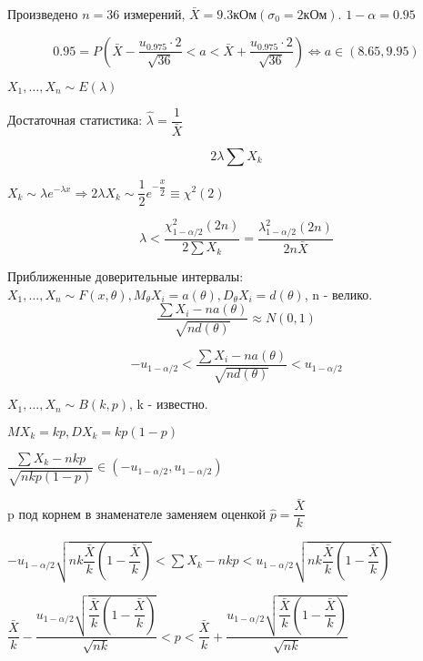 \begin{ex}
  Произведено $n=36$ измерений, $\bar X = 9.3 \text{кОм} (\sigma_0 = 2 \text{кОм})$.
$1- \alpha = 0.95$

\[
  0.95 = P\left(\bar X - \dfrac{u_{0.975} \cdot 2}{\sqrt{36}} < a < \bar X + \dfrac{u_{0.975} \cdot 2}{\sqrt{36}}\right) \Leftrightarrow a \in (8.65, 9.95)
\]
\end{ex}

\begin{ex}
  $X_1, \dots, X_n \sim E(\lambda)$

  Достаточная статистика: $\hat \lambda = \dfrac{1}{\bar X}$

  $$2\lambda \sum X_k$$

  $X_k \sim \lambda e^{-\lambda x} \Rightarrow 2\lambda X_k \sim \dfrac{1}{2} e^{-\dfrac{x}{2}} \equiv \chi^2 (2)$

  $$\lambda < \dfrac{\chi^2_{1-\alpha/2} (2n)}{2 \sum X_k} = \dfrac{\lambda^2_{1-\alpha/2} (2n)}{2n \bar X}$$
\end{ex}

  Приближенные доверительные интервалы:
  $X_1, \dots, X_n \sim F(x, \theta), M_\theta X_i = a(\theta), D_\theta X_i = d(\theta)$, n - велико. 
  $$\dfrac{\sum X_i - n a(\theta)}{\sqrt{n d(\theta)}} \approx N(0, 1)$$

  $$- u_{1 - \alpha/2} < \dfrac{\sum X_i - n a(\theta)}{\sqrt{n d(\theta)}}< u_{1-\alpha/2}$$

\begin{ex}
  $X_1, \dots, X_n \sim B(k, p)$, k - известно.

  $M X_k = kp, D X_k = k p (1-p)$

  $\dfrac{\sum X_k - n k p}{\sqrt{nkp(1-p)}} \in (-u_{1-\alpha/2}, u_{1-\alpha/2})$

  p под корнем в знаменателе заменяем оценкой $\hat p = \dfrac{\bar X}{k}$

  $-u_{1-\alpha/2} \sqrt{nk \dfrac{\bar X}{k} (1 - \dfrac{\bar X}{k})} < \sum X_k - nkp < u_{1-\alpha/2} \sqrt{nk \dfrac{\bar X}{k} (1 - \dfrac{\bar X}{k})}$

  $\dfrac{\bar X}{k} - \dfrac{u_{1-\alpha/2} \sqrt{\dfrac{\bar X}{k} (1 - \dfrac{\bar X}{k})}}{\sqrt{nk}} < p < \dfrac{\bar X}{k} + \dfrac{u_{1-\alpha/2} \sqrt{\dfrac{\bar X}{k} (1 - \dfrac{\bar X}{k})}}{\sqrt{nk}}$
\end{ex}
